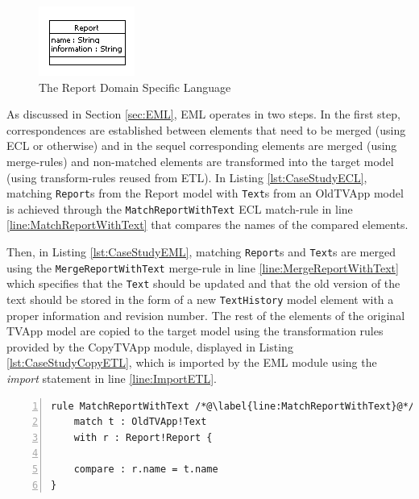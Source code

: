 \begin{figure}
	\centering
		\includegraphics{images/Report}
	\caption{The Report Domain Specific Language}
	\label{fig:Report}
\end{figure}

As discussed in Section \ref{sec:EML}, EML operates in two steps. In the first step, correspondences are established between elements that need to be merged (using ECL or otherwise) and in the sequel corresponding elements are merged (using merge-rules) and non-matched elements are transformed into the target model (using transform-rules reused from ETL). In Listing \ref{lst:CaseStudyECL}, matching \texttt{Report}s from the Report model with \texttt{Text}s from an OldTVApp model is achieved through the \texttt{MatchReportWithText} ECL match-rule in line \ref{line:MatchReportWithText} that compares the names of the compared elements.

Then, in Listing \ref{lst:CaseStudyEML}, matching \texttt{Report}s and \texttt{Text}s are merged using the \texttt{MergeReportWithText} merge-rule in line \ref{line:MergeReportWithText} which specifies that the \texttt{Text} should be updated and that the old version of the text should be stored in the form of a new \texttt{TextHistory} model element with a proper information and revision number. The rest of the elements of the original TVApp model are copied to the target model using the transformation rules provided by the CopyTVApp module, displayed in Listing \ref{lst:CaseStudyCopyETL}, which is imported by the EML module using the \emph{import} statement in line \ref{line:ImportETL}.

\begin{lstlisting}[basicstyle=\ttfamily\footnotesize, flexiblecolumns=true, numbers=left, nolol=true, caption=ECL module that compares a TVApp with a Report model, label=lst:CaseStudyECL, language=ECL, tabsize=2]
rule MatchReportWithText /*@\label{line:MatchReportWithText}@*/
	match t : OldTVApp!Text
	with r : Report!Report {
	
	compare : r.name = t.name	
}
\end{lstlisting}

